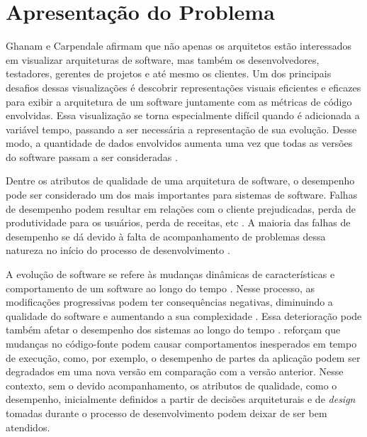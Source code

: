 
\section{Apresentação do Problema} \label{sec:apresentacao-do-problema}

Ghanam e Carpendale \cite{Ghanam2008} afirmam que não apenas os arquitetos estão interessados em visualizar arquiteturas de software, mas também os desenvolvedores, testadores, gerentes de projetos e até mesmo os clientes. Um dos principais desafios dessas visualizações é descobrir representações visuais eficientes e eficazes para exibir a arquitetura de um software juntamente com as métricas de código envolvidas. Essa visualização se torna especialmente difícil quando é adicionada a variável tempo, passando a ser necessária a representação de sua evolução. Desse modo, a quantidade de dados envolvidos aumenta uma vez que todas as versões do software passam a ser consideradas \cite{Caserta2011}\cite{Khan2012}.

Dentre os atributos de qualidade de uma arquitetura de software, o desempenho pode ser considerado um dos mais importantes para sistemas de software. Falhas de desempenho podem resultar em relações com o cliente prejudicadas, perda de produtividade para os usuários, perda de receitas, etc \cite{Williams1998}. A maioria das falhas de desempenho se dá devido à falta de acompanhamento de problemas dessa natureza no início do processo de desenvolvimento \cite{Williams1998}.

A evolução de software se refere às mudanças dinâmicas de características e comportamento de um software ao longo do tempo \cite{Pablo2016}. Nesse processo, as modificações progressivas podem ter consequências negativas, diminuindo a qualidade do software e aumentando a sua complexidade \cite{BeladyLaszloA.andLehman1976}\cite{LehmanMeirMandRamilJuanFandWernickPaulDandPerryDewayneEandTurski}. Essa deterioração pode também afetar o desempenho dos sistemas ao longo do tempo \cite{Molyneaux2009}. \citeauthor{SandovalAlcocer2013} reforçam que mudanças no código-fonte podem causar comportamentos inesperados em tempo de execução, como, por exemplo, o desempenho de partes da aplicação podem ser degradados em uma nova versão em comparação com a versão anterior. Nesse contexto, sem o devido acompanhamento, os atributos de qualidade, como o desempenho, inicialmente definidos a partir de decisões arquiteturais e de \textit{design} tomadas durante o processo de desenvolvimento podem deixar de ser bem atendidos.

